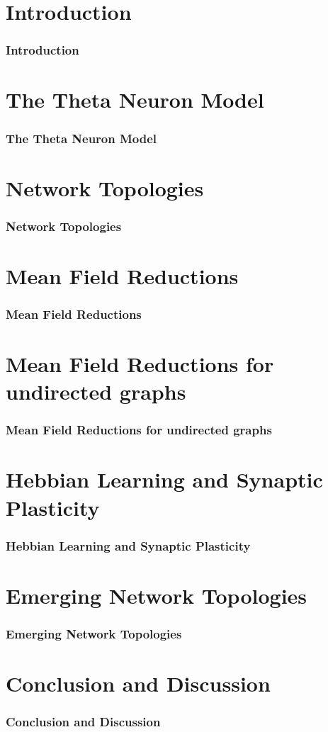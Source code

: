 
\section{Introduction}
\begin{frame}
\frametitle{Introduction}
\end{frame}


\section{The Theta Neuron Model}
\begin{frame}
\frametitle{The Theta Neuron Model}
\end{frame}


\section{Network Topologies}
\begin{frame}
\frametitle{Network Topologies}
\end{frame}


\section{Mean Field Reductions}
\begin{frame}
\frametitle{Mean Field Reductions}
\end{frame}

\section{\mywork Mean Field Reductions for undirected graphs} 
\begin{frame}
\frametitle{\mywork Mean Field Reductions for undirected graphs} 
\end{frame}


\section{Hebbian Learning and Synaptic Plasticity} 
\begin{frame}
\frametitle{Hebbian Learning and Synaptic Plasticity}
\end{frame}


\section{\mywork Emerging Network Topologies} 
\begin{frame}
\frametitle{\mywork Emerging Network Topologies}
\end{frame}


\section{Conclusion and Discussion} 
\begin{frame}
\frametitle{Conclusion and Discussion}
\end{frame}
